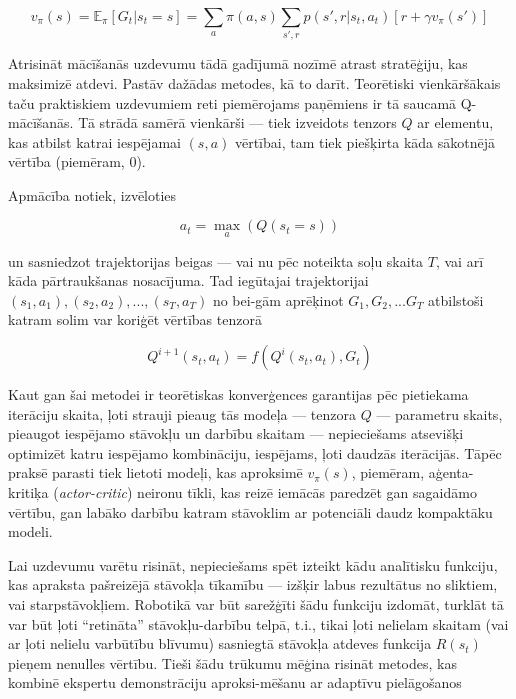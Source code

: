 \documentclass[12pt, a4paper]{article}
\numberwithin{equation}{section} %
\begin{document}
\begin{equation}
    v_{\pi}(s) = \mathbb{E}_{\pi}[G_t \vert s_t = s] = \sum_{a}\pi(a,s)\sum_{s', r}p(s', r \vert s_t, a_t)[r + \gamma v_{\pi}(s')]
\end{equation}

Atrisināt mācīšanās uzdevumu tādā gadījumā nozīmē atrast stratēģiju, kas maksimizē atdevi. Pastāv dažādas metodes, kā to darīt. Teorētiski vienkāršākais taču praktiskiem uzdevumiem reti piemērojams paņēmiens ir tā saucamā Q-mācīšanās. Tā strādā samērā vienkārši --- tiek izveidots tenzors $Q$ ar elementu, kas atbilst katrai iespējamai $(s,a)$ vērtībai, tam tiek piešķirta kāda sākotnējā vērtība (piemēram, 0). 

Apmācība notiek, izvēloties

\begin{equation}
    a_t = \max\limits_{a} (Q(s_t = s))
\end{equation}

un sasniedzot trajektorijas beigas --- vai nu pēc noteikta soļu skaita $T$, vai arī kāda pārtraukšanas nosacījuma. Tad iegūtajai trajektorijai $(s_1, a_1), (s_2, a_2), ..., (s_T, a_T)$ no bei-gām aprēķinot $G_1, G_2, ... G_T$ atbilstoši katram solim var koriģēt vērtības tenzorā

\begin{equation}
    Q^{i+1}(s_t,a_t)=f(Q^{i}(s_t, a_t), G_t)
\end{equation}

Kaut gan šai metodei ir teorētiskas konverģences garantijas pēc pietiekama iterāciju skaita, ļoti strauji pieaug tās modeļa --- tenzora $Q$ --- parametru skaits, pieaugot iespējamo stāvokļu un darbību skaitam --- nepieciešams atsevišķi optimizēt katru iespējamo kombināciju, iespējams, ļoti daudzās iterācijās. Tāpēc praksē parasti tiek lietoti modeļi, kas aproksimē $v_{\pi}(s)$, piemēram, aģenta-kritiķa (\textit{actor-critic}) neironu tīkli, kas reizē iemācās paredzēt gan sagaidāmo vērtību, gan labāko darbību katram stāvoklim ar potenciāli daudz kompaktāku modeli.

Lai uzdevumu varētu risināt, nepieciešams spēt izteikt kādu analītisku funkciju, kas apraksta pašreizējā stāvokļa tīkamību --- izšķir labus rezultātus no sliktiem, vai starpstāvokļiem. Robotikā var būt sarežģīti šādu funkciju izdomāt, turklāt tā var būt ļoti ``retināta'' stāvokļu-darbību telpā, t.i., tikai ļoti nelielam skaitam (vai ar ļoti nelielu varbūtību blīvumu) sasniegtā stāvokļa atdeves funkcija $R(s_t)$ pieņem nenulles vērtību. Tieši šādu trūkumu mēģina risināt metodes, kas kombinē ekspertu demonstrāciju aproksi-mēšanu ar adaptīvu pielāgošanos\cite{nair2018overcoming}
\end{document}
